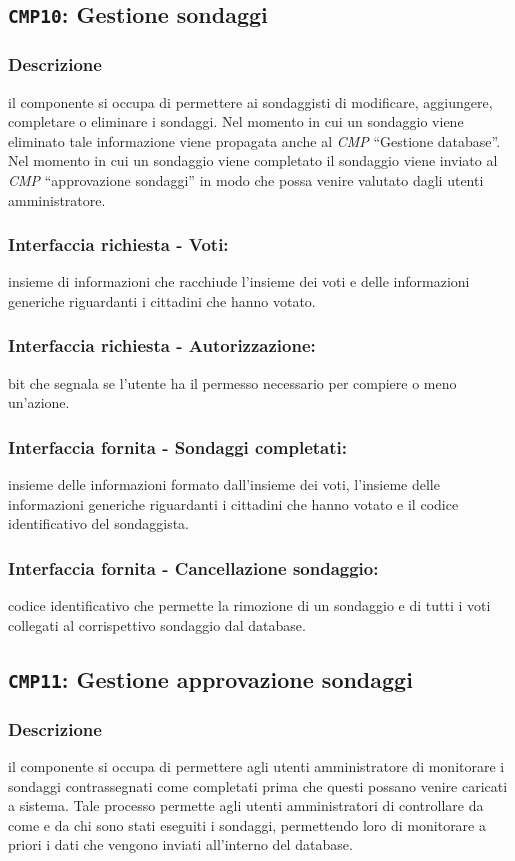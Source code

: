     \subsection{\texttt{CMP10}: Gestione sondaggi}
        \subsubsection{Descrizione}
            il componente si occupa di permettere ai sondaggisti di modificare, aggiungere, completare o eliminare i sondaggi. Nel momento in cui un sondaggio viene eliminato tale informazione viene propagata anche al \textit{CMP} ``Gestione database''. Nel momento in cui un sondaggio viene completato il sondaggio viene inviato al \textit{CMP} ``approvazione sondaggi'' in modo che possa venire valutato dagli utenti amministratore.
        \subsubsection{Interfaccia richiesta - Voti:}
            insieme di informazioni che racchiude l'insieme dei voti e delle informazioni generiche riguardanti i cittadini che hanno votato.
        \subsubsection{Interfaccia richiesta - Autorizzazione:}
            bit che segnala se l'utente ha il permesso necessario per compiere o meno un'azione.
        \subsubsection{Interfaccia fornita - Sondaggi completati:}
            insieme delle informazioni formato dall'insieme dei voti, l'insieme delle informazioni generiche riguardanti i cittadini che hanno votato e il codice identificativo del sondaggista.
        \subsubsection{Interfaccia fornita - Cancellazione sondaggio:}
            codice identificativo che permette la rimozione di un sondaggio e di tutti i voti collegati al corrispettivo sondaggio dal database.

    \subsection{\texttt{CMP11}: Gestione approvazione sondaggi}
        \subsubsection{Descrizione}
            il componente si occupa di permettere agli utenti amministratore di monitorare i sondaggi contrassegnati come completati prima che questi possano venire caricati a sistema. Tale processo permette agli utenti amministratori di controllare da come e da chi sono stati eseguiti i sondaggi, permettendo loro di monitorare a priori i dati che vengono inviati all'interno del database. 

